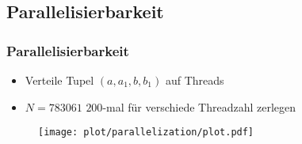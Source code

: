 \subsection*{Parallelisierbarkeit}
\begin{frame}
  \frametitle{Parallelisierbarkeit}
  \begin{itemize}
    \item Verteile Tupel $\left(a,a_1,b,b_1\right)$ auf Threads
    \item $N=783061$ $200$-mal für verschiede Threadzahl zerlegen
  \end{itemize}
  \begin{figure}[H]
    \centering
    \texttt{[image: plot/parallelization/plot.pdf]}
  \end{figure}
\end{frame}
